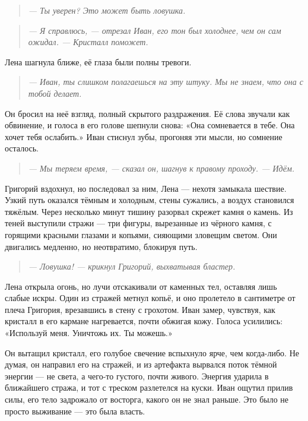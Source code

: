 \documentclass[12pt,a4paper]{book}
\newenvironment{dialogue}{\begin{quote}\itshape}{\end{quote}}
\begin{document}
\begin{dialogue}
--- Ты уверен? Это может быть ловушка.
\end{dialogue}

\begin{dialogue}
--- Я справлюсь, --- отрезал Иван, его тон был холоднее, чем он сам ожидал. --- Кристалл поможет.
\end{dialogue}

Лена шагнула ближе, её глаза были полны тревоги.

\begin{dialogue}
--- Иван, ты слишком полагаешься на эту штуку. Мы не знаем, что она с тобой делает.
\end{dialogue}

Он бросил на неё взгляд, полный скрытого раздражения. Её слова звучали как обвинение, и голоса в его голове шепнули снова: «Она сомневается в тебе. Она хочет тебя ослабить.» Иван стиснул зубы, прогоняя эти мысли, но сомнение осталось.

\begin{dialogue}
--- Мы теряем время, --- сказал он, шагнув к правому проходу. --- Идём.
\end{dialogue}

Григорий вздохнул, но последовал за ним, Лена --- нехотя замыкала шествие. Узкий путь оказался тёмным и холодным, стены сужались, а воздух становился тяжёлым. Через несколько минут тишину разорвал скрежет камня о камень. Из теней выступили стражи --- три фигуры, вырезанные из чёрного камня, с горящими красными глазами и копьями, сияющими зловещим светом. Они двигались медленно, но неотвратимо, блокируя путь.

\begin{dialogue}
--- Ловушка! --- крикнул Григорий, выхватывая бластер.
\end{dialogue}

Лена открыла огонь, но лучи отскакивали от каменных тел, оставляя лишь слабые искры. Один из стражей метнул копьё, и оно пролетело в сантиметре от плеча Григория, врезавшись в стену с грохотом. Иван замер, чувствуя, как кристалл в его кармане нагревается, почти обжигая кожу. Голоса усилились: «Используй меня. Уничтожь их. Ты можешь.»

Он вытащил кристалл, его голубое свечение вспыхнуло ярче, чем когда-либо. Не думая, он направил его на стражей, и из артефакта вырвался поток тёмной энергии --- не света, а чего-то густого, почти живого. Энергия ударила в ближайшего стража, и тот с треском разлетелся на куски. Иван ощутил прилив силы, его тело задрожало от восторга, какого он не знал раньше. Это было не просто выживание --- это была власть.
\end{document}
